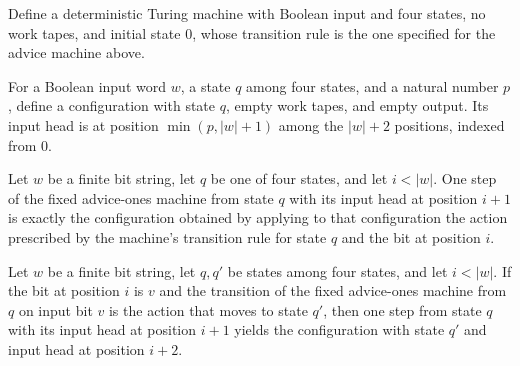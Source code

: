 \begin{definition}
\label{Complexity.adviceOnesTM}
\leanok
{}
Define a deterministic Turing machine with Boolean input and four states, no work tapes,
and initial state $0$, whose transition rule is the one specified for the advice machine
above.
\end{definition}

\begin{definition}
\label{Complexity.aoCfg}
\leanok
{}
For a Boolean input word $w$, a state $q$ among four states, and a natural number $p$,
define a configuration with state $q$, empty work tapes, and empty output. Its input
head is at position $\min(p, |w|+1)$ among the $|w|+2$ positions, indexed from $0$.
\end{definition}

\begin{lemma}
\label{Complexity.ao_step}
\leanok
{}
Let $w$ be a finite bit string, let $q$ be one of four states, and let $i<|w|$. One step
of the fixed advice-ones machine from state $q$ with its input head at position $i+1$ is
exactly the configuration obtained by applying to that configuration the action
prescribed by the machine's transition rule for state $q$ and the bit at position $i$.
\end{lemma}

\begin{lemma}
\label{Complexity.ao_move}
\leanok
{}
Let $w$ be a finite bit string, let $q,q'$ be states among four states, and let $i<|w|$.
If the bit at position $i$ is $v$ and the transition of the fixed advice-ones machine
from $q$ on input bit $v$ is the action that moves to state $q'$, then one step from
state $q$ with its input head at position $i+1$ yields the configuration with state $q'$
and input head at position $i+2$.
\end{lemma}


